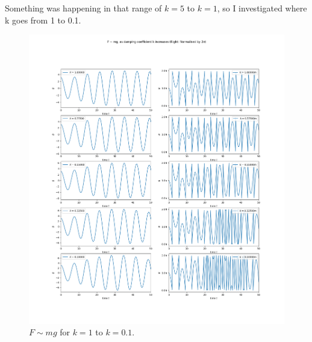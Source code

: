 \documentclass[10pt, twocolumn]{article}
\begin{document}
Something was happening in that range of $k = 5$ to $k = 1$, so I investigated where k goes from 1 to 0.1.
\begin{figure}
    \centering
    \includegraphics[width = \columnwidth]{Projects/ForcedSimplePendulum/Plots/F~mg as damping coefficient k increases from 1 to 0.1.png}
    \caption{$F \sim{mg}$ for $k = 1$ to $k = 0.1$.}
    \label{k 1 to 0.1}
\end{figure}
\end{document}
